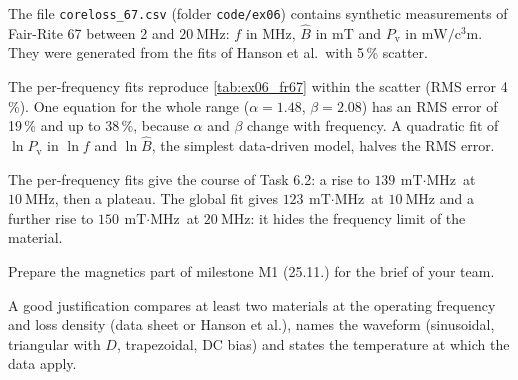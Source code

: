 The file \texttt{coreloss\_67.csv} (folder \texttt{code/ex06}) contains synthetic measurements of Fair-Rite 67 between 2 and $\SI{20}{\mega\hertz}$: $f$ in MHz, $\hat{B}$ in mT and $P_\mathrm{v}$ in $\si{\milli\watt\per\cubic\centi\metre}$. They were generated from the fits of Hanson et al.\ with 5\,\% scatter.


\begin{solutionblock}
	The per-frequency fits reproduce \autoref{tab:ex06_fr67} within the scatter (RMS error 4\,\%). One equation for the whole range ($\alpha=1.48$, $\beta=2.08$) has an RMS error of 19\,\% and up to 38\,\%, because $\alpha$ and $\beta$ change with frequency. A quadratic fit of $\ln P_\mathrm{v}$ in $\ln f$ and $\ln\hat{B}$, the simplest data-driven model, halves the RMS error.
\end{solutionblock}


\begin{solutionblock}
	The per-frequency fits give the course of Task 6.2: a rise to $\SI{139}{\milli\tesla\cdot\mega\hertz}$ at $\SI{10}{\mega\hertz}$, then a plateau. The global fit gives $\SI{123}{\milli\tesla\cdot\mega\hertz}$ at $\SI{10}{\mega\hertz}$ and a further rise to $\SI{150}{\milli\tesla\cdot\mega\hertz}$ at $\SI{20}{\mega\hertz}$: it hides the frequency limit of the material.
\end{solutionblock}



Prepare the magnetics part of milestone M1 (25.11.) for the brief of your team.


\begin{solutionblock}
	A good justification compares at least two materials at the operating frequency and loss density (data sheet or Hanson et al.), names the waveform (sinusoidal, triangular with $D$, trapezoidal, DC bias) and states the temperature at which the data apply.
\end{solutionblock}

